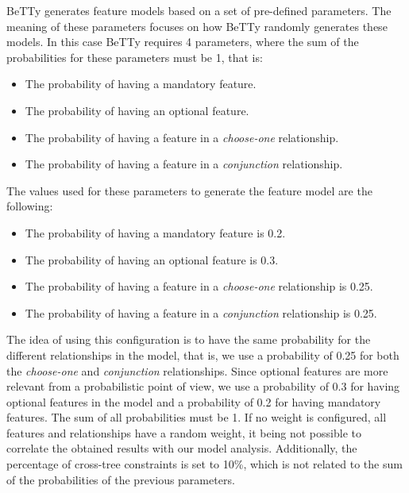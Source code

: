 BeTTy generates feature models based on a set of pre-defined parameters.
The meaning of these parameters focuses on how
BeTTy randomly generates these models.
In this case BeTTy requires 4 parameters, where the sum of the probabilities
for these parameters must be 1, that is:

\begin{itemize}
        \item The probability of having a mandatory feature.
        \item The probability of having an optional feature.
        \item The probability of having a feature in a \emph{choose-one} relationship.
        \item The probability of having a feature in a \emph{conjunction} relationship.
\end{itemize}

The values used for these parameters to generate the feature model are the following:

\begin{itemize}
        \item The probability of having a mandatory feature is 0.2.
        \item The probability of having an optional feature is 0.3.
        \item The probability of having a feature in a \emph{choose-one} relationship is 0.25.
        \item The probability of having a feature in a \emph{conjunction} relationship is 0.25.
\end{itemize}


The idea of using this configuration is to have the same probability for the different
relationships in the model, that is, we use a probability of 0.25 for both the
\emph{choose-one} and \emph{conjunction} relationships.
Since optional features are more relevant from a probabilistic point
of view, we use a probability of 0.3 for having optional features in
the model and a probability of 0.2 for having mandatory features.  The
sum of all probabilities must be 1. If no weight is configured, all
features and relationships have a random weight, it being not possible
to correlate the obtained results with our model analysis.
Additionally, the percentage of cross-tree constraints is set to 10\%,
which is not related to the sum of the probabilities of the previous
parameters.

